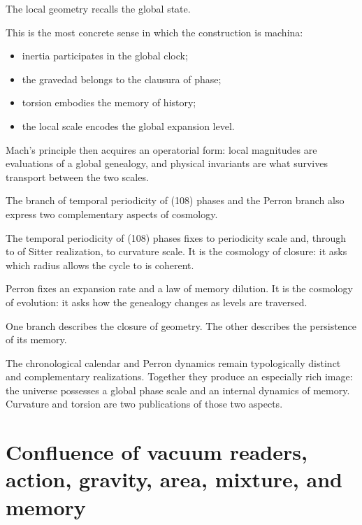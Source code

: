 The local geometry recalls the global state.\par

This is the most concrete sense in which the construction is machina:\par

\begin{itemize}[leftmargin=*,itemsep=0.35em]
\item inertia participates in the global clock;
\item the gravedad belongs to the clausura of phase;
\item torsion embodies the memory of history;
\item the local scale encodes the global expansion level.
\end{itemize}

Mach's principle then acquires an operatorial form: local magnitudes are evaluations of a global genealogy, and physical invariants are what survives transport between the two scales.\par

The branch of temporal periodicity of (108) phases and the Perron branch also express two complementary aspects of cosmology.\par

The temporal periodicity of (108) phases fixes to periodicity scale and, through to of Sitter realization, to curvature scale. It is the cosmology of closure: it asks which radius allows the cycle to is coherent.\par

Perron fixes an expansion rate and a law of memory dilution. It is the cosmology of evolution: it asks how the genealogy changes as levels are traversed.\par

One branch describes the closure of geometry. The other describes the persistence of its memory.\par

The chronological calendar and Perron dynamics remain typologically distinct and complementary realizations. Together they produce an especially rich image: the universe possesses a global phase scale and an internal dynamics of memory. Curvature and torsion are two publications of those two aspects.\par

\section{Confluence of vacuum readers, action, gravity, area, mixture, and memory}

